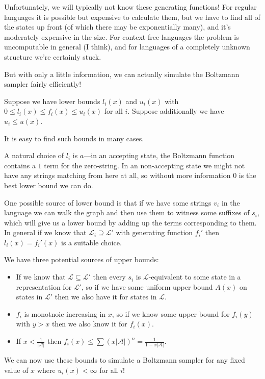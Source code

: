 \documentclass[a4paper]{book}
\begin{document}
Unfortunately, we will typically not know these generating functions!
For regular languages it is possible but expensive to calculate them,
but we have to find all of the states up front (of which there may be exponentially many),
and it's moderately expensive in the size.
For context-free languages the problem is uncomputable in general (I think),
and for languages of a completely unknown structure we're certainly stuck.

But with only a little information,
we can actually simulate the Boltzmann sampler fairly efficiently!

Suppose we have lower bounds \(l_i(x)\) and \(u_i(x)\) with \(0 \leq l_i(x) \leq f_i(x) \leq u_i(x)\) for all \(i\).
Suppose additionally we have \(u_i \leq u(x)\).

It is easy to find such bounds in many cases.

A natural choice of \(l_i\) is \(a\)---in an accepting state,
the Boltzmann function contains a \(1\) term for the zero-string.
In an non-accepting state we might not have any strings matching from here at all,
so without more information \(0\) is the best lower bound we can do.

One possible source of lower bound is that if we have some strings \(v_i\) in the language we can walk the graph and then use them to witness some suffixes of \(s_i\),
which will give us a lower bound by adding up the terms corresponding to them.
In general if we know that \(\mathcal{L}_i \supseteq \mathcal{L}'\) with generating function \(f_i'\) then \(l_i(x) = f_i'(x)\) is a suitable choice.

We have three potential sources of upper bounds:

\begin{itemize}
\item If we know that \(\mathcal{L} \subseteq \mathcal{L}'\) then every \(s_i\) is \(\mathcal{L}\)-equivalent to some state in a representation for \(\mathcal{L}'\),
so if we have some uniform upper bound \(A(x)\) on states in \(\mathcal{L}'\) then we also have it for states in \(\mathcal{L}\).
\item \(f_i\) is monotnoic increasing in \(x\), so if we know some upper bound for \(f_i(y)\) with \(y > x\) then we also know it for \(f_i(x)\).
\item If \(x < \frac{1}{|\mathcal{A}|}\) then \(f_i(x) \leq \sum {(x |\mathcal{A}|)}^n = \frac{1}{1 - x |\mathcal{A}|}\).
\end{itemize}

We can now use these bounds to simulate a Boltzmann sampler for any fixed value of \(x\) where \(u_i(x) < \infty\) for all \(i\)!
\end{document}
